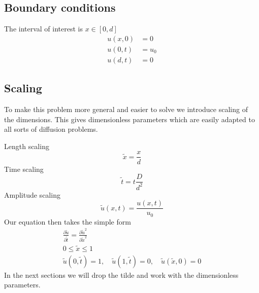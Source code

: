 \documentclass[11pt,a4paper,draft]{article}
\numberwithin{equation}{section}
\begin{document}
\subsection{Boundary conditions}
The interval of interest is $x \in [0, d]$
\begin{align}
u(x,0) &= 0\\
u(0,t) &= u_0\\
u(d,t) &= 0
\end{align}

\subsection{Scaling}
To make this problem more general and easier to solve we introduce 
scaling of the dimensions. This gives dimensionless parameters which 
are easily adapted to all sorts of diffusion problems.

Length scaling
\begin{equation}
\tilde{x} = \frac{x}{d}
\end{equation}
Time scaling
\begin{equation}
\tilde{t} = t\frac{D}{d^2}
\end{equation}
Amplitude scaling
\begin{equation}
\tilde{u}(x,t) = \frac{u(x,t)}{u_0}
\end{equation}
Our equation then takes the simple form
\begin{gather}
\frac{\partial \tilde{u}}{\partial \tilde{t}}
= \frac{\partial \tilde{u}^2}{\partial \tilde{x}^2}\\
0 \le \tilde{x} \le 1\\
\tilde{u}(0,\tilde{t})
= 1, \quad \tilde{u}(1,\tilde{t}) = 0, \quad \tilde{u}(\tilde{x}, 0 ) = 0
\end{gather}
In the next sections we will drop the tilde and work with the 
dimensionless parameters.
\end{document}
